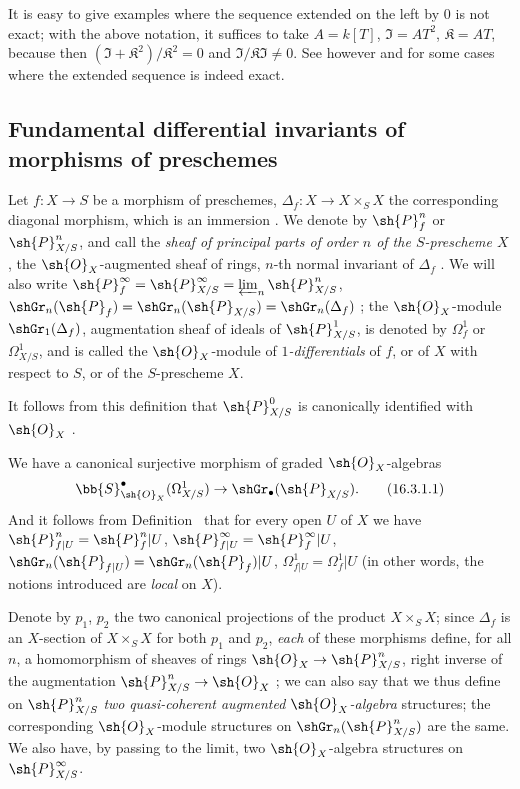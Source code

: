 It is easy to give examples where the sequence  extended on the left by $0$ is not exact;
with the above notation, it suffices to take $A = k[T]$, $\mathfrak{I} = AT^2$, $\mathfrak{K} = AT$, because then $(\mathfrak{I} + \mathfrak{K}^2)/\mathfrak{K}^2 = 0$ and $\mathfrak{I}/\mathfrak{K}\mathfrak{I} \neq 0$.
See however  and  for some cases where the extended sequence is indeed exact.

\subsection{Fundamental differential invariants of morphisms of preschemes}
\label{IV.16.3}

\begin{definition}[16.3.1]
\label{IV.16.3.1}
Let $f:X \to S$ be a morphism of preschemes, $\Delta_f: X \to X \times_S X$ the corresponding diagonal morphism, which is an immersion .
We denote by $\sh{P}_f^n$ or $\sh{P}_{X/S}^n$, and call the \emph{sheaf of principal parts of order $n$ of the $S$-prescheme $X$}, the $\sh{O}_X$-augmented sheaf of rings, $n$-th normal invariant of $\Delta_f$ .
We will also write $\sh{P}_f^\infty = \sh{P}_{X/S}^\infty = \varprojlim_n \sh{P}_{X/S}^n$, $\shGr_n(\sh{P}_f) = \shGr_n(\sh{P}_{X/S}) = \shGr_n(\Delta_f)$ ;
the $\sh{O}_X$-module $\shGr_1(\Delta_f)$, augmentation sheaf of ideals of $\sh{P}_{X/S}^1$, is denoted by $\Omega_f^1$ or $\Omega_{X/S}^1$, and is called the $\sh{O}_X$-module of \emph{$1$-differentials} of $f$, or of $X$ with respect to $S$, or of the $S$-prescheme $X$.
\end{definition}

It follows from this definition that $\sh{P}_{X/S}^0$ is canonically identified with $\sh{O}_X$ .

We have  a canonical surjective morphism of graded $\sh{O}_X$-algebras 
\[
  \label{IV.16.3.1.1}
  \bb{S}_{\sh{O}_X}^\bullet(\Omega_{X/S}^1) \to \shGr_\bullet(\sh{P}_{X/S}).
  \tag{16.3.1.1}
\]
And it follows from Definition~ that for every open $U$ of $X$ we have $\sh{P}_{f|U}^n = \sh{P}_f^n|U$, $\sh{P}_{f|U}^\infty = \sh{P}_f^\infty|U$, $\shGr_n(\sh{P}_{f|U}) = \shGr_n(\sh{P}_f)|U$, $\Omega_{f|U}^1 = \Omega_f^1|U$ (in other words, the notions introduced are \emph{local} on $X$).

\begin{env}[16.3.2]
\label{IV.16.3.2}
Denote by $p_1$, $p_2$ the two canonical projections of the product $X \times_S X$;
since $\Delta_f$ is an $X$-section of $X \times_S X$ for both $p_1$ and $p_2$, \emph{each} of these morphisms define, for all $n$, a homomorphism of sheaves of rings $\sh{O}_X \to \sh{P}_{X/S}^n$, right inverse of the augmentation $\sh{P}_{X/S}^n \to \sh{O}_X$ ;
we can also say that we thus define on $\sh{P}_{X/S}^n$ \emph{two} \emph{quasi-coherent augmented $\sh{O}_X$-algebra} structures;
the corresponding $\sh{O}_X$-module structures on $\shGr_n(\sh{P}_{X/S}^n)$ are the same. 
We also have, by passing to the limit, two $\sh{O}_X$-algebra structures on $\sh{P}_{X/S}^\infty$.
\end{env}

